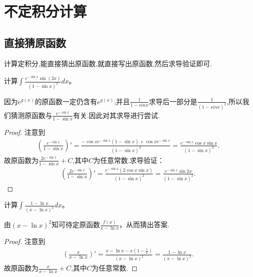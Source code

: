 \documentclass[../../main.tex]{subfiles}
\begin{document}
\section{不定积分计算}

\subsection{直接猜原函数}

计算定积分,能直接猜出原函数,就直接写出原函数,然后求导验证即可.

\vspace{0.5cm}

\begin{example}
计算\(\int \frac{e^{-\sin x}\sin(2x)}{(1 - \sin x)^2}dx\)。
\end{example}
\begin{note}
因为$e^{g(x)}$的原函数一定仍含有$e^{g(x)}$,并且$\frac{1}{1-sinx}$求导后一部分是$\frac{1}{(1-sinx)^2}$,所以我们猜测原函数与$\frac{e^{-\sin x}}{1-\sin x}$有关.因此对其求导进行尝试.
\end{note}
\begin{proof}
注意到
\begin{align*}
\left(\frac{e^{-\sin x}}{1 - \sin x}\right)' = \frac{-\cos x e^{-\sin x}(1 - \sin x)+\cos x e^{-\sin x}}{(1 - \sin x)^2}
=\frac{e^{-\sin x}\cos x\sin x}{(1 - \sin x)^2}.
\end{align*}
故原函数为\(\frac{2e^{-\sin x}}{1 - \sin x}+C\),其中$C$为任意常数.求导验证：
\begin{align*}
\left(\frac{2e^{-\sin x}}{1 - \sin x}\right)'=\frac{e^{-\sin x}(2\cos x\sin x)}{(1 - \sin x)^2}=\frac{e^{-\sin x}\sin 2x}{(1 - \sin x)^2}.
\end{align*} 
\end{proof}

\begin{example}
计算\(\int \frac{1 - \ln x}{(x - \ln x)^2}dx\)。
\end{example}
\begin{note}
由\((x - \ln x)^2\)知可待定原函数\(\frac{f(x)}{x - \ln x}\)，从而猜出答案.
\end{note}
\begin{proof}
注意到
\begin{align*}
\left( \frac{x}{x-\ln x} \right) \prime =\frac{x-\ln x-x\left( 1-\frac{1}{x} \right)}{\left( x-\ln x \right) ^2}=\frac{1-\ln x}{\left( x-\ln x \right) ^2}.
\end{align*}
故原函数为$\frac{x}{x-\ln x}+C$,其中$C$为任意常数.
\end{proof}
\end{document}
